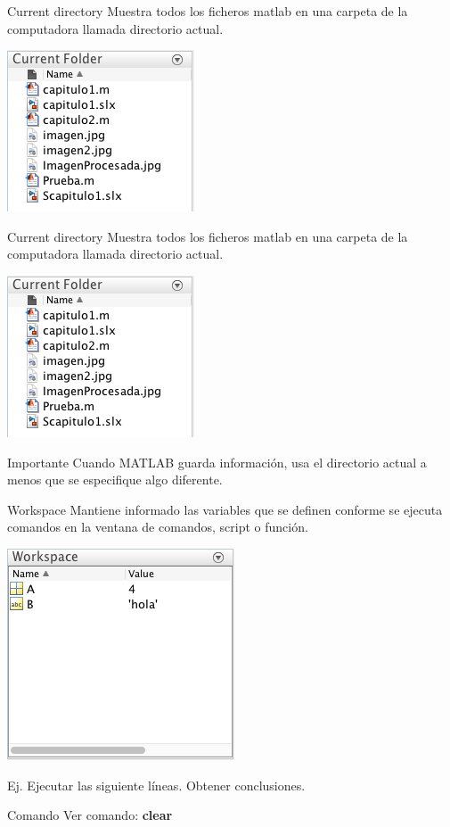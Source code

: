 \documentclass{bredelebeamer}
\begin{document}
\begin{frame}{Current directory}
Muestra todos los ficheros matlab en una carpeta de la computadora llamada directorio actual.
\begin{center}
\includegraphics[scale=0.3]{images/pantalla4.png}
\end{center}
\end{frame}

\begin{frame}{Current directory}
Muestra todos los ficheros matlab en una carpeta de la computadora llamada directorio actual.
\begin{center}
\includegraphics[scale=0.3]{images/pantalla4.png}
\end{center}
\begin{alertblock}{Importante}
Cuando MATLAB guarda información, usa el directorio actual a menos que se especifique algo diferente.
\end{alertblock}
\end{frame}

\begin{frame}{Workspace}
Mantiene informado las variables que se definen conforme se ejecuta comandos en la ventana de comandos, script o función.
\begin{center}
\includegraphics[scale=0.3]{images/pantalla5.png}
\end{center}
Ej. Ejecutar las siguiente líneas. Obtener conclusiones.

\begin{exampleblock}{Comando}
Ver comando: \textbf{clear}
\end{exampleblock}
\end{frame}
\end{document}
